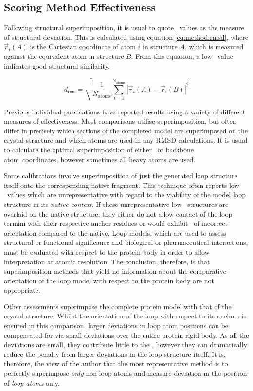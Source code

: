 \subsection{Scoring Method Effectiveness}
\label{section:methcomp:superimpos}



Following structural superimposition, it is usual to quote \crms\ values as the measure of structural deviation. This is calculated using equation \ref{eq:method:rmsd},  where $\vec r_i(A)$ is the Cartesian coordinate of atom $i$ in structure $A$, which is
measured against the equivalent atom in structure $B$. From this equation, a low
\crms\ value indicates
good structural similarity.

\begin{equation}
d_\mathrm{rms}=\sqrt{\frac{1}{N_\mathrm{atoms}} \displaystyle\sum_{i=1}^\mathrm{N_\mathrm{atoms}} \left\vert \vec r_i(A)-\vec r_i(B)\right\vert^2 }
\label{eq:method:rmsd}
\end{equation}

Previous individual publications have reported results using a variety of different measures of effectiveness. Most comparisons utilise superimposition, but often differ in precisely which sections of the completed model are superimposed on the crystal structure and which atoms are used in any RMSD calculations. It is usual to calculate the optimal superimposition of either \ca\ or backbone atom\ coordinates, however sometimes all heavy atoms are used.

Some calibrations involve superimposition of just the generated loop structure itself onto the corresponding native fragment\cite{METHOD:LIP}.  This technique often reports  low \crms\ values which are unrepresentative
with regard to the viability of the model loop structure in its \emph{native context}. If
these unrepresentative low-\crms\, structures are overlaid on the native structure, they either do not allow contact of the loop termini with their respective anchor residues or would exhibit \cacbvects\ of incorrect orientation compared to the native. Loop models, which are used to assess structural or functional significance and biological or pharmaceutical interactions, must be evaluated with respect to the protein body in order to allow interpretation at atomic resolution.
The conclusion, therefore, is that superimposition methods that yield no information about the comparative orientation of the loop model with respect to the protein body are not appropriate. 

Other assessments superimpose the complete protein model with that of the crystal structure\cite{METHOD:Plop}. Whilst the orientation of the loop with respect to its anchors is ensured in this comparison, larger deviations in loop atom positions can be compensated for via small deviations over the entire protein rigid-body. As all the deviations are small, they contribute little to the \crms, however they can dramatically reduce the penalty from larger deviations in the loop structure itself. It is,  therefore, the view of the author that the most representative method is to perfectly superimpose \emph{only}  non-loop atoms  and measure deviation in the position of \emph{loop atoms} only.

